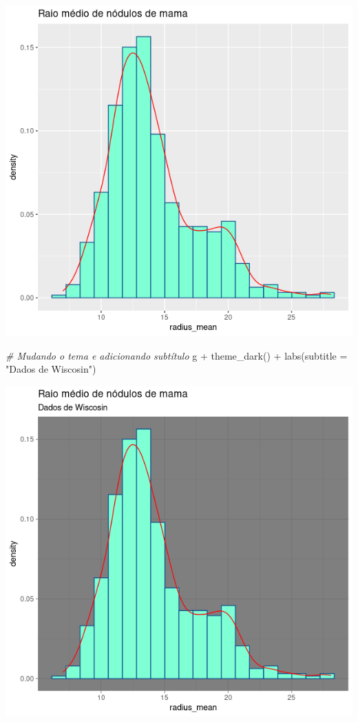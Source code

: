 \documentclass[
]{book}
\newenvironment{Shaded}{\begin{snugshade}}{\end{snugshade}}
\newcommand{\AttributeTok}[1]{\textcolor[rgb]{0.77,0.63,0.00}{#1}}
\newcommand{\CommentTok}[1]{\textcolor[rgb]{0.56,0.35,0.01}{\textit{#1}}}
\newcommand{\FunctionTok}[1]{\textcolor[rgb]{0.00,0.00,0.00}{#1}}
\newcommand{\NormalTok}[1]{#1}
\newcommand{\SpecialCharTok}[1]{\textcolor[rgb]{0.00,0.00,0.00}{#1}}
\newcommand{\StringTok}[1]{\textcolor[rgb]{0.31,0.60,0.02}{#1}}
\begin{document}
\includegraphics{figure/g21.png}

\begin{Shaded}
\begin{Highlighting}[]
\CommentTok{\# Mudando o tema e adicionando subtítulo}
\NormalTok{g }\SpecialCharTok{+} \FunctionTok{theme\_dark}\NormalTok{() }\SpecialCharTok{+}
  \FunctionTok{labs}\NormalTok{(}\AttributeTok{subtitle =} \StringTok{"Dados de Wiscosin"}\NormalTok{)}
\end{Highlighting}
\end{Shaded}

\includegraphics{figure/g22.png}
\end{document}
